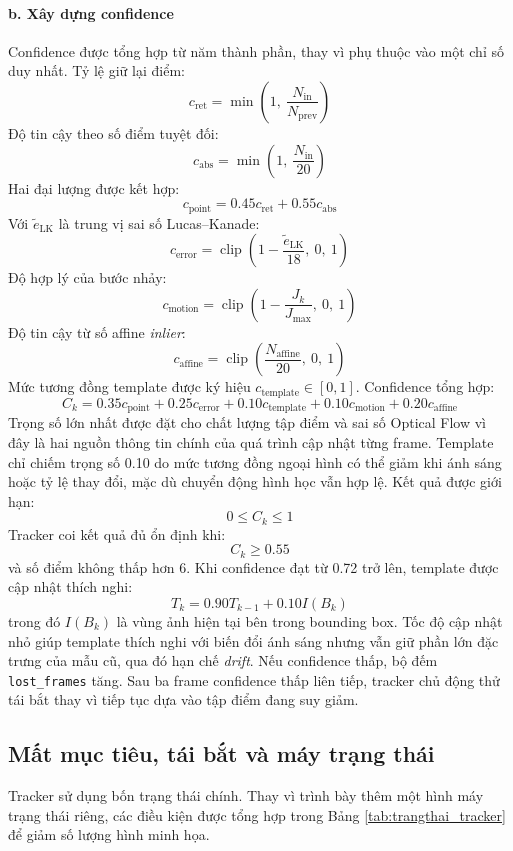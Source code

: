 \documentclass[../DoAn.tex]{subfiles}
\begin{document}
\paragraph{b. Xây dựng confidence}
Confidence được tổng hợp từ năm thành phần, thay vì phụ thuộc vào một chỉ số duy nhất. Tỷ lệ giữ lại điểm:
\[
c_{\mathrm{ret}} = \min\left(1,\ \frac{N_{\mathrm{in}}}{N_{\mathrm{prev}}}\right)
\]
Độ tin cậy theo số điểm tuyệt đối:
\[
c_{\mathrm{abs}} = \min\left(1,\ \frac{N_{\mathrm{in}}}{20}\right)
\]
Hai đại lượng được kết hợp:
\[
c_{\mathrm{point}} = 0.45 c_{\mathrm{ret}} + 0.55 c_{\mathrm{abs}}
\]
Với $\widetilde{e}_{\mathrm{LK}}$ là trung vị sai số Lucas--Kanade:
\[
c_{\mathrm{error}} = \operatorname{clip}\left(1 - \frac{\widetilde{e}_{\mathrm{LK}}}{18},\ 0,\ 1\right)
\]
Độ hợp lý của bước nhảy:
\[
c_{\mathrm{motion}} = \operatorname{clip}\left(1 - \frac{J_k}{J_{\max}},\ 0,\ 1\right)
\]
Độ tin cậy từ số affine \textit{inlier}:
\[
c_{\mathrm{affine}} = \operatorname{clip}\left(\frac{N_{\mathrm{affine}}}{20},\ 0,\ 1\right)
\]
Mức tương đồng template được ký hiệu $c_{\mathrm{template}} \in [0, 1]$. Confidence tổng hợp:
\[
C_k = 0.35 c_{\mathrm{point}} + 0.25 c_{\mathrm{error}} + 0.10 c_{\mathrm{template}} + 0.10 c_{\mathrm{motion}} + 0.20 c_{\mathrm{affine}}
\]
Trọng số lớn nhất được đặt cho chất lượng tập điểm và sai số Optical Flow vì đây là hai nguồn thông tin chính của quá trình cập nhật từng frame. Template chỉ chiếm trọng số 0.10 do mức tương đồng ngoại hình có thể giảm khi ánh sáng hoặc tỷ lệ thay đổi, mặc dù chuyển động hình học vẫn hợp lệ. Kết quả được giới hạn:
\[
0 \leq C_k \leq 1
\]
Tracker coi kết quả đủ ổn định khi:
\[
C_k \geq 0.55
\]
và số điểm không thấp hơn 6. Khi confidence đạt từ 0.72 trở lên, template được cập nhật thích nghi:
\[
T_k = 0.90 T_{k-1} + 0.10 I(B_k)
\]
trong đó $I(B_k)$ là vùng ảnh hiện tại bên trong bounding box. Tốc độ cập nhật nhỏ giúp template thích nghi với biến đổi ánh sáng nhưng vẫn giữ phần lớn đặc trưng của mẫu cũ, qua đó hạn chế \textit{drift}. Nếu confidence thấp, bộ đếm \texttt{lost\_frames} tăng. Sau ba frame confidence thấp liên tiếp, tracker chủ động thử tái bắt thay vì tiếp tục dựa vào tập điểm đang suy giảm.

\subsection{Mất mục tiêu, tái bắt và máy trạng thái}

Tracker sử dụng bốn trạng thái chính. Thay vì trình bày thêm một hình máy trạng thái riêng, các điều kiện được tổng hợp trong Bảng \ref{tab:trangthai_tracker} để giảm số lượng hình minh họa.
\end{document}

